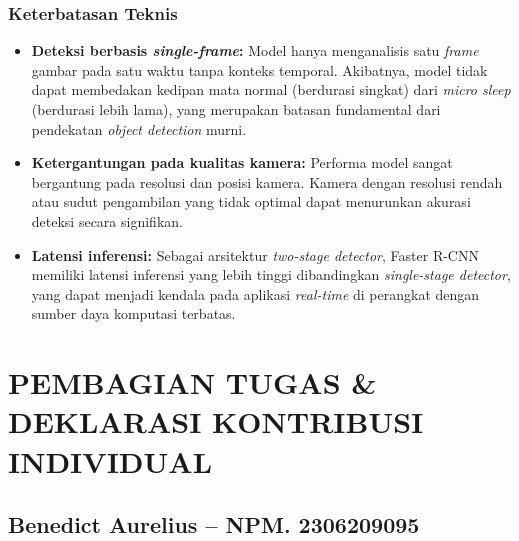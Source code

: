 \documentclass[11pt,a4paper,oneside]{report}
\begin{document}
\subsection*{Keterbatasan Teknis}

\begin{itemize}[leftmargin=*]
    \item \textbf{Deteksi berbasis \textit{single-frame}:} Model hanya menganalisis satu \textit{frame} gambar pada satu waktu tanpa konteks temporal. Akibatnya, model tidak dapat membedakan kedipan mata normal (berdurasi singkat) dari \textit{micro sleep} (berdurasi lebih lama), yang merupakan batasan fundamental dari pendekatan \textit{object detection} murni.
    \item \textbf{Ketergantungan pada kualitas kamera:} Performa model sangat bergantung pada resolusi dan posisi kamera. Kamera dengan resolusi rendah atau sudut pengambilan yang tidak optimal dapat menurunkan akurasi deteksi secara signifikan.
    \item \textbf{Latensi inferensi:} Sebagai arsitektur \textit{two-stage detector}, Faster R-CNN memiliki latensi inferensi yang lebih tinggi dibandingkan \textit{single-stage detector}, yang dapat menjadi kendala pada aplikasi \textit{real-time} di perangkat dengan sumber daya komputasi terbatas.
\end{itemize}

\chapter{PEMBAGIAN TUGAS \& DEKLARASI KONTRIBUSI INDIVIDUAL}
\label{bab:kontribusi}

\section{Benedict Aurelius -- NPM. 2306209095}
\end{document}
